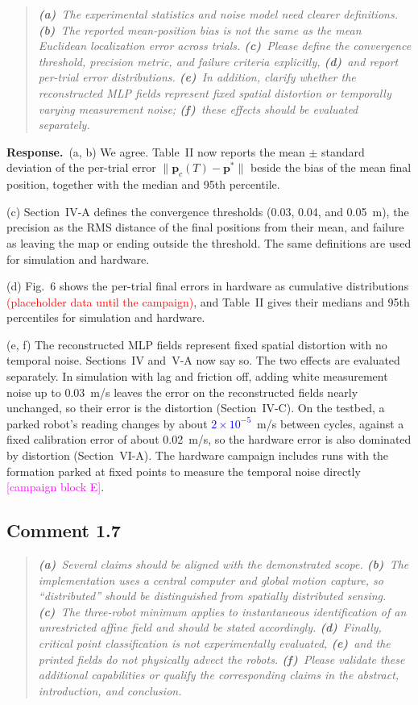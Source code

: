 \documentclass[10pt]{article}
\newcommand{\syn}[1]{\textcolor{red}{#1}}            %
\newcommand{\rev}[1]{\textcolor{blue}{#1}}           %
\newcommand{\open}[1]{\textcolor{magenta}{[#1]}}     %
\newcommand{\resp}{\par\textbf{Response.}~}
\begin{document}
\begin{quote}\itshape
\textbf{(a)}~The experimental statistics and noise model need clearer definitions.
\textbf{(b)}~The reported mean-position bias is not the same as the mean Euclidean localization error across trials.
\textbf{(c)}~Please define the convergence threshold, precision metric, and failure criteria explicitly,
\textbf{(d)}~and report per-trial error distributions.
\textbf{(e)}~In addition, clarify whether the reconstructed MLP fields represent fixed spatial distortion or temporally varying measurement noise;
\textbf{(f)}~these effects should be evaluated separately.
\end{quote}


\resp (a, b) We agree. Table~II now reports the mean $\pm$ standard deviation of the per-trial error $\|\mathbf{p}_c(T) - \mathbf{p}^*\|$ beside the bias of the mean final position, together with the median and 95th percentile.

(c) Section~IV-A defines the convergence thresholds (0.03, 0.04, and 0.05~m), the precision as the RMS distance of the final positions from their mean, and failure as leaving the map or ending outside the threshold. The same definitions are used for simulation and hardware.

(d) Fig.~6 shows the per-trial final errors in hardware as cumulative distributions \syn{(placeholder data until the campaign)}, and Table~II gives their medians and 95th percentiles for simulation and hardware.

(e, f) The reconstructed MLP fields represent fixed spatial distortion with no temporal noise. Sections~IV and~V-A now say so. The two effects are evaluated separately. In simulation with lag and friction off, adding white measurement noise up to 0.03~m/s leaves the error on the reconstructed fields nearly unchanged, so their error is the distortion (Section~IV-C). On the testbed, a parked robot's reading changes by about \rev{$2\times10^{-5}$}~m/s between cycles, against a fixed calibration error of about 0.02~m/s, so the hardware error is also dominated by distortion (Section~VI-A). The hardware campaign includes runs with the formation parked at fixed points to measure the temporal noise directly \open{campaign block E}.

\subsection*{Comment 1.7}

\begin{quote}\itshape
\textbf{(a)}~Several claims should be aligned with the demonstrated scope.
\textbf{(b)}~The implementation uses a central computer and global motion capture, so ``distributed'' should be distinguished from spatially distributed sensing.
\textbf{(c)}~The three-robot minimum applies to instantaneous identification of an unrestricted affine field and should be stated accordingly.
\textbf{(d)}~Finally, critical point classification is not experimentally evaluated,
\textbf{(e)}~and the printed fields do not physically advect the robots.
\textbf{(f)}~Please validate these additional capabilities or qualify the corresponding claims in the abstract, introduction, and conclusion.
\end{quote}
\end{document}
